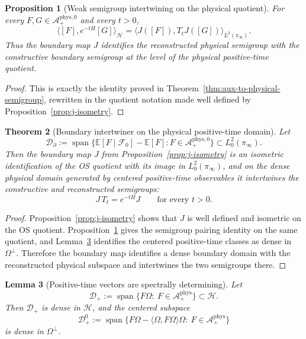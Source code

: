 \documentclass[11pt]{article}
\newtheorem{theorem}{Theorem}[section]
\newtheorem{proposition}[theorem]{Proposition}
\newtheorem{lemma}[theorem]{Lemma}
\theoremstyle{definition}
\theoremstyle{remark}
\newcommand{\mcA}{\mathcal A}
\newcommand{\mcH}{\mathcal H}
\begin{document}
\begin{proposition}[Weak semigroup intertwining on the physical quotient]
\label{prop:j-intertwining}
For every \(F,G\in\mcA^{\mathrm{phys},0}_+\) and every \(t>0\),
\[
\langle [F],e^{-tH}[G]\rangle_{\mcH}
=
\langle J([F]),T_tJ([G])\rangle_{L^2(\pi_\infty)}.
\]
Thus the boundary map \(J\) identifies the reconstructed physical semigroup
with the constructive boundary semigroup at the level of the physical
positive-time quotient.
\end{proposition}

\begin{proof}
This is exactly the identity proved in
Theorem~\ref{thm:aux-to-physical-semigroup}, rewritten in the quotient notation
made well defined by Proposition~\ref{prop:j-isometry}.
\end{proof}

\begin{theorem}[Boundary intertwiner on the physical positive-time domain]
\label{thm:boundary-intertwiner}
Let
\[
\mathcal D_\partial
:=
\operatorname{span}\bigl\{\mathbb E[F\mid\mathcal F_0]-\mathbb E[F]:
F\in\mcA^{\mathrm{phys},0}_+\bigr\}
\subset L^2_0(\pi_\infty).
\]
Then the boundary map \(J\) from Proposition~\ref{prop:j-isometry} is an
isometric identification of the OS quotient with its image in
\(L^2_0(\pi_\infty)\), and on the dense physical domain generated by centered
positive-time observables it intertwines the constructive and reconstructed
semigroups:
\[
J\,T_t=e^{-tH}J
\qquad\text{for every }t>0.
\]
\end{theorem}

\begin{proof}
Proposition~\ref{prop:j-isometry} shows that \(J\) is well defined and
isometric on the OS quotient.  Proposition~\ref{prop:j-intertwining} gives the
semigroup pairing identity on the same quotient, and
Lemma~\ref{lem:positive-time-dense} identifies the centered positive-time
classes as dense in \(\Omega^\perp\).  Therefore the boundary map identifies a
dense boundary domain with the reconstructed physical subspace and intertwines
the two semigroups there.
\end{proof}

\begin{lemma}[Positive-time vectors are spectrally determining]
\label{lem:positive-time-dense}
Let
\[
\mathcal{D}_+:=\operatorname{span}\{F\Omega:\ F\in\mcA^{\mathrm{phys}}_+\}\subset\mcH.
\]
Then $\mathcal{D}_+$ is dense in $\mcH$, and the centered subspace
\[
\mathcal{D}_+^0:=\operatorname{span}\{F\Omega-\langle\Omega,F\Omega\rangle\Omega:\ F
\in\mcA^{\mathrm{phys}}_+\}
\]
is dense in $\Omega^\perp$.
\end{lemma}
\end{document}
